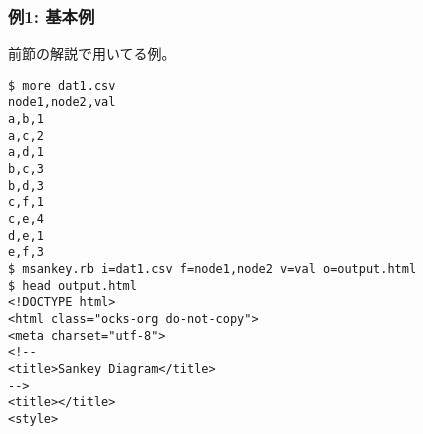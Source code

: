 \subsubsection*{例1: 基本例}

前節の解説で用いてる例。


\begin{Verbatim}[baselinestretch=0.7,frame=single]
$ more dat1.csv
node1,node2,val
a,b,1
a,c,2
a,d,1
b,c,3
b,d,3
c,f,1
c,e,4
d,e,1
e,f,3
$ msankey.rb i=dat1.csv f=node1,node2 v=val o=output.html
$ head output.html
<!DOCTYPE html>
<html class="ocks-org do-not-copy">
<meta charset="utf-8">
<!--
<title>Sankey Diagram</title>
-->
<title></title>
<style>
\end{Verbatim}
